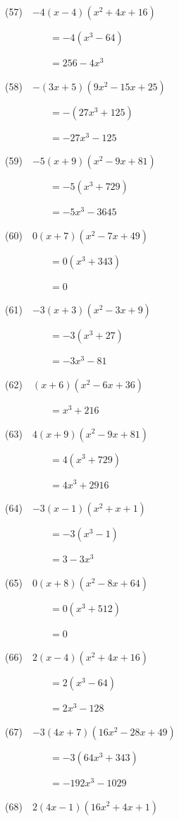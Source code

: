\documentclass[a4j,twocolumn,10pt,fleqn]{jarticle}
\begin{document}
(57)~~$-4\left(x - 4\right) \left(x^{2} + 4 x + 16\right)$

~~~~~~~~~$=-4(x^{3} - 64)$

~~~~~~~~~$=256 - 4 x^{3}$

(58)~~$-\left(3 x + 5\right) \left(9 x^{2} - 15 x + 25\right)$

~~~~~~~~~$=-(27 x^{3} + 125)$

~~~~~~~~~$=- 27 x^{3} - 125$

(59)~~$-5\left(x + 9\right) \left(x^{2} - 9 x + 81\right)$

~~~~~~~~~$=-5(x^{3} + 729)$

~~~~~~~~~$=- 5 x^{3} - 3645$

(60)~~$0\left(x + 7\right) \left(x^{2} - 7 x + 49\right)$

~~~~~~~~~$=0(x^{3} + 343)$

~~~~~~~~~$=0$

(61)~~$-3\left(x + 3\right) \left(x^{2} - 3 x + 9\right)$

~~~~~~~~~$=-3(x^{3} + 27)$

~~~~~~~~~$=- 3 x^{3} - 81$

(62)~~$\left(x + 6\right) \left(x^{2} - 6 x + 36\right)$

~~~~~~~~~$=x^{3} + 216$

(63)~~$4\left(x + 9\right) \left(x^{2} - 9 x + 81\right)$

~~~~~~~~~$=4(x^{3} + 729)$

~~~~~~~~~$=4 x^{3} + 2916$

(64)~~$-3\left(x - 1\right) \left(x^{2} + x + 1\right)$

~~~~~~~~~$=-3(x^{3} - 1)$

~~~~~~~~~$=3 - 3 x^{3}$

(65)~~$0\left(x + 8\right) \left(x^{2} - 8 x + 64\right)$

~~~~~~~~~$=0(x^{3} + 512)$

~~~~~~~~~$=0$

(66)~~$2\left(x - 4\right) \left(x^{2} + 4 x + 16\right)$

~~~~~~~~~$=2(x^{3} - 64)$

~~~~~~~~~$=2 x^{3} - 128$

(67)~~$-3\left(4 x + 7\right) \left(16 x^{2} - 28 x + 49\right)$

~~~~~~~~~$=-3(64 x^{3} + 343)$

~~~~~~~~~$=- 192 x^{3} - 1029$

(68)~~$2\left(4 x - 1\right) \left(16 x^{2} + 4 x + 1\right)$
\end{document}
